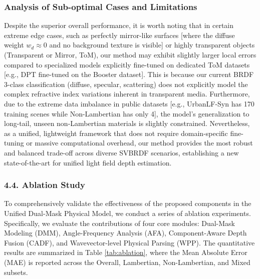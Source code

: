\subsubsection{Analysis of Sub-optimal Cases and Limitations}
Despite the superior overall performance, it is worth noting that in certain extreme edge cases, such as perfectly mirror-like surfaces  [where the diffuse weight $w_d \approx 0$ and no background texture is visible] or highly transparent objects (Transparent or Mirror, ToM), our method may exhibit slightly larger local errors compared to specialized models explicitly fine-tuned on dedicated ToM datasets  [e.g., DPT fine-tuned on the Booster dataset]. This is because our current BRDF 3-class classification (diffuse, specular, scattering) does not explicitly model the complex refractive index variations inherent in transparent media. Furthermore, due to the extreme data imbalance in public datasets  [e.g., UrbanLF-Syn has 170 training scenes while Non-Lambertian has only 4], the model's generalization to long-tail, unseen non-Lambertian materials is slightly constrained. Nevertheless, as a unified, lightweight framework that does not require domain-specific fine-tuning or massive computational overhead, our method provides the most robust and balanced trade-off across diverse SVBRDF scenarios, establishing a new state-of-the-art for unified light field depth estimation.

\subsubsection{4.4. Ablation Study}

To comprehensively validate the effectiveness of the proposed components in the Unified Dual-Mask Physical Model, we conduct a series of ablation experiments. Specifically, we evaluate the contributions of four core modules: Dual-Mask Modeling (DMM), Angle-Frequency Analysis (AFA), Component-Aware Depth Fusion (CADF), and Wavevector-level Physical Parsing (WPP). The quantitative results are summarized in Table \ref{tab:ablation}, where the Mean Absolute Error (MAE) is reported across the Overall, Lambertian, Non-Lambertian, and Mixed subsets.

